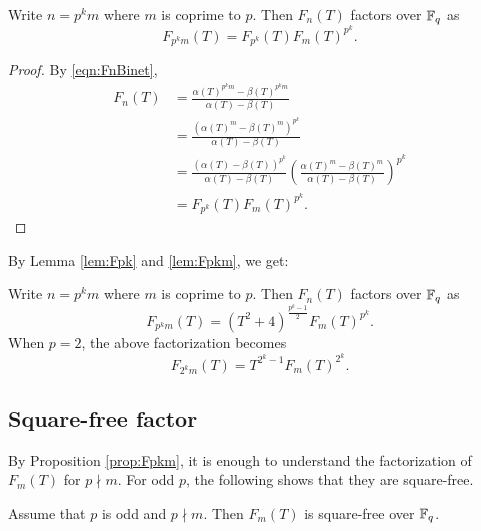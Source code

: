 \begin{lemma}
\label{lem:Fpkm}
    Write \(n = p^k m\) where \(m\) is coprime to \(p\). Then \(F_n(T)\) factors over \(\mathbb{F}_q\) as
    \begin{equation}
        F_{p^k m}(T) = F_{p^k}(T) F_m(T)^{p^k}.
    \end{equation}
\end{lemma}
\begin{proof}
    By \eqref{eqn:FnBinet},
    \begin{align*}
        F_n(T) &= \frac{\alpha(T)^{p^k m} - \beta(T)^{p^k m}}{\alpha(T) - \beta(T)} \\
        &= \frac{(\alpha(T)^{m} - \beta(T)^m)^{p^k}}{\alpha(T) - \beta(T)} \\
        &= \frac{(\alpha(T) - \beta(T))^{p^k}}{\alpha(T) - \beta(T)}\left(\frac{\alpha(T)^m - \beta(T)^m}{\alpha(T) - \beta(T)}\right)^{p^k} \\
        &= F_{p^k}(T) F_m(T)^{p^k}.
    \end{align*}
\end{proof}

By Lemma \ref{lem:Fpk} and \ref{lem:Fpkm}, we get:

\begin{proposition}
\label{prop:Fpkm}
    Write \(n = p^k m\) where \(m\) is coprime to \(p\). Then \(F_n(T)\) factors over \(\mathbb{F}_q\) as
    \begin{equation}
    \label{eqn:Fpkmfactor}
        F_{p^k m}(T) = (T^2 + 4)^{\frac{p^k - 1}{2}} F_m(T)^{p^k}.
    \end{equation}
    When $p = 2$, the above factorization becomes
    \begin{equation}
        \label{eqn:F2kmfactor}
        F_{2^k m}(T) = T^{2^k - 1} F_m(T)^{2^k}.
    \end{equation}
\end{proposition}

\subsection{Square-free factor}

By Proposition \ref{prop:Fpkm}, it is enough to understand the factorization of $F_m(T)$ for $p \nmid m$.
For odd $p$, the following shows that they are square-free. 
\begin{proposition}
\label{prop:Fmsqfree}
    Assume that \(p\) is odd and \(p \nmid m\). Then \(F_m(T)\) is square-free over \(\mathbb{F}_q\).
\end{proposition}

